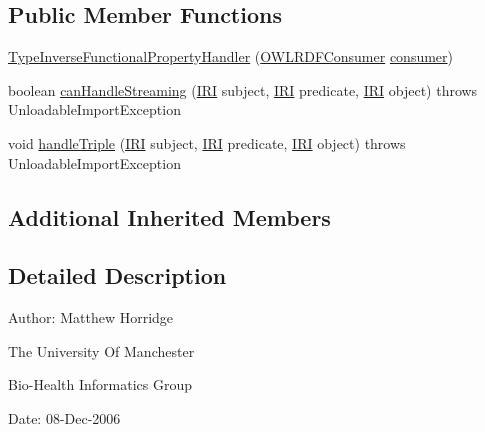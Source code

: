\subsection*{Public Member Functions}
\begin{DoxyCompactItemize}
\item 
\hyperlink{classorg_1_1coode_1_1owlapi_1_1rdfxml_1_1parser_1_1_type_inverse_functional_property_handler_a02a9ffefaa9a002ae6da2e2c3fb94e39}{Type\-Inverse\-Functional\-Property\-Handler} (\hyperlink{classorg_1_1coode_1_1owlapi_1_1rdfxml_1_1parser_1_1_o_w_l_r_d_f_consumer}{O\-W\-L\-R\-D\-F\-Consumer} \hyperlink{classorg_1_1coode_1_1owlapi_1_1rdfxml_1_1parser_1_1_abstract_triple_handler_a4ccf4d898ff01eb1cadfa04b23d54e9c}{consumer})
\item 
boolean \hyperlink{classorg_1_1coode_1_1owlapi_1_1rdfxml_1_1parser_1_1_type_inverse_functional_property_handler_ab627a0c3f8c6a2758e5b59abc277209d}{can\-Handle\-Streaming} (\hyperlink{classorg_1_1semanticweb_1_1owlapi_1_1model_1_1_i_r_i}{I\-R\-I} subject, \hyperlink{classorg_1_1semanticweb_1_1owlapi_1_1model_1_1_i_r_i}{I\-R\-I} predicate, \hyperlink{classorg_1_1semanticweb_1_1owlapi_1_1model_1_1_i_r_i}{I\-R\-I} object)  throws Unloadable\-Import\-Exception 
\item 
void \hyperlink{classorg_1_1coode_1_1owlapi_1_1rdfxml_1_1parser_1_1_type_inverse_functional_property_handler_a55b615926a0fb69288ef2d7a71899782}{handle\-Triple} (\hyperlink{classorg_1_1semanticweb_1_1owlapi_1_1model_1_1_i_r_i}{I\-R\-I} subject, \hyperlink{classorg_1_1semanticweb_1_1owlapi_1_1model_1_1_i_r_i}{I\-R\-I} predicate, \hyperlink{classorg_1_1semanticweb_1_1owlapi_1_1model_1_1_i_r_i}{I\-R\-I} object)  throws Unloadable\-Import\-Exception 
\end{DoxyCompactItemize}
\subsection*{Additional Inherited Members}


\subsection{Detailed Description}
Author\-: Matthew Horridge\par
 The University Of Manchester\par
 Bio-\/\-Health Informatics Group\par
 Date\-: 08-\/\-Dec-\/2006\par
\par
 

